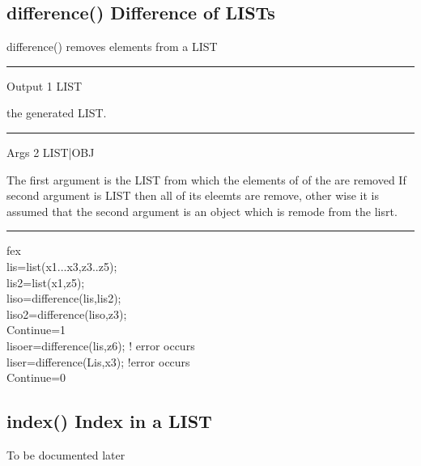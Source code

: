 \subsection{\textcolor{VioletRed}{difference}() Difference of LISTs}
\label{difference}
\textcolor{VioletRed}{difference}() removes elements from a LIST
\vspace{0.3cm}
\hrule
\vspace{0.3cm}
\noindent Output \tabto{3cm}  1 \tabto{5cm}  LIST  \tabto{7cm}
\begin{changemargin}{3cm}{0cm}
\noindent  the generated LIST.
\end{changemargin}
\vspace{0.3cm}
\hrule
\vspace{0.3cm}
\noindent Args \tabto{3cm} 2 \tabto{5cm}  LIST|OBJ  \tabto{7cm}
\begin{changemargin}{3cm}{0cm}
\noindent  The first argument is the LIST from which the elements of of the
are removed  If second argument is LIST then all of its eleemts are remove, other wise
it is assumed that the second argument is an object which is remode from the lisrt.
\end {changemargin}
\hrule
\vspace{0.2cm}
\begin{example}[diffex]fex\\
\label{diffex}
lis=\textcolor{VioletRed}{list}(x1...x3,z3..z5);\\
lis2=\textcolor{VioletRed}{list}(x1,z5);\\
liso=\textcolor{VioletRed}{difference}(lis,lis2);\\
liso2=\textcolor{VioletRed}{difference}(liso,z3);\\
Continue=1\\
lisoer=\textcolor{VioletRed}{difference}(lis,z6); ! error occurs\\
liser=\textcolor{VioletRed}{difference}(Lis,x3);  !error occurs\\
Continue=0
\end{example}
\subsection{\textcolor{VioletRed}{index}() Index in a LIST}
\label{index}
To be documented later
